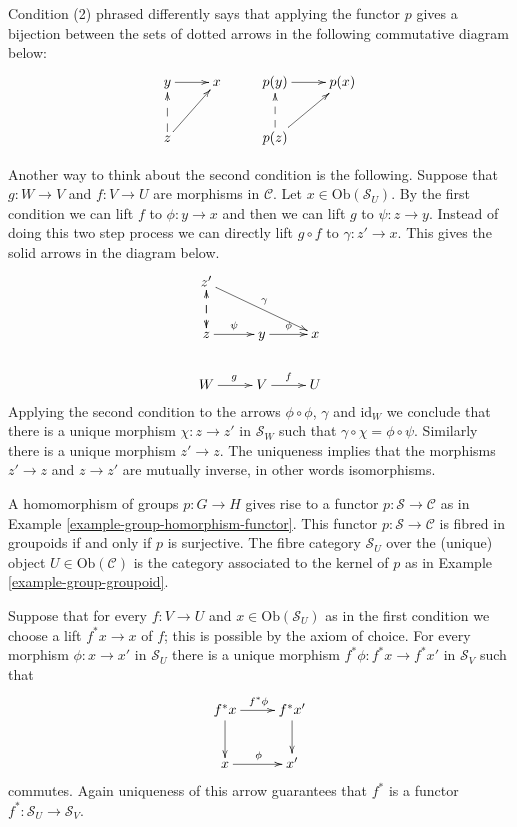 \noindent
Condition (2) phrased differently says that 
applying the functor $p$ gives a bijection between the sets 
of dotted arrows in the following commutative diagram below:
$$
\xymatrix{
y \ar[r] & x & p(y) \ar[r] & p(x) \\
z \ar@{-->}[u] \ar[ru] & & p(z) \ar@{-->}[u]\ar[ru] & \\
}
$$

\smallskip\noindent
Another way to think about the second condition is the following.
Suppose that $g : W \to V$ and $f : V \to U$ are morphisms in $\mathcal{C}$. 
Let $x \in \text{Ob}(\mathcal{S}_U)$. By the first condition we can lift
$f$ to $ \phi : y \to x$ and then we can lift $g$ to $\psi : z \to y$.
Instead of doing this two step process we can directly lift $g \circ f$ to
$\gamma : z' \to x$. This gives the solid arrows in the diagram below.
$$
\xymatrix{
z' \ar@{-->}[d]\ar[rrd]^\gamma & & \\
z \ar@{-->}[u]\ar[r]^\psi & y \ar[r]^\phi & x \\
W \ar[r]^g & V \ar[r]^f & U \\
}
$$
Applying the second condition to the arrows $\phi \circ \phi$, $\gamma$
and $\text{id}_W$ we conclude that there is a unique morphism 
$\chi : z \to z'$ in $\mathcal{S}_W$ such that 
$\gamma \circ \chi = \phi \circ \psi$. Similarly there is a unique morphism
$z' \to z$. The uniqueness implies that the morphisms $z' \to z$ and
$z\to z'$ are mutually inverse, in other words isomorphisms.

\begin{example}
\label{example-group-homomorphism-fibreedingroupoids}
A homomorphism of groups $p : G \to H$ gives rise to a functor 
$p\colon \mathcal{S}\to\mathcal{C}$ as in Example 
\ref{example-group-homorphism-functor}. This functor
$p\colon \mathcal{S}\to\mathcal{C}$ is fibred in groupoids if and only if 
$p$ is surjective.  The fibre category $\mathcal{S}_{U}$ over the (unique)
object $U\in \text{Ob}(\mathcal{C})$ is the category associated to the
kernel of $p$ as in Example \ref{example-group-groupoid}.
\end{example}

\smallskip\noindent
Suppose that for every $f : V \to U$ and $x\in \text{Ob}(\mathcal{S}_U)$
as in the first condition we choose a lift
$f^\ast x \to x$ of $f$; this is possible by the axiom of choice. For
every morphism $\phi : x \to x'$ in $\mathcal{S}_U$ there is a unique
morphism $f^\ast \phi : f^\ast x \to f^\ast x'$ in $\mathcal{S}_V$
such that
$$
\xymatrix{
f^\ast x \ar[r]^{f^\ast \phi} \ar[d] & f^\ast x' \ar[d] \\
x \ar[r]^{\phi} & x' }
$$
commutes. Again uniqueness of this arrow guarantees that $f^\ast$ is a
functor $ f^\ast : \mathcal{S}_U \to \mathcal{S}_V$. 

